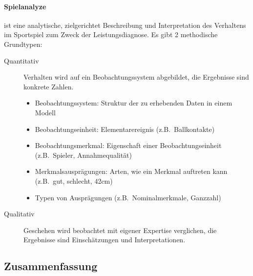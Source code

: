 \paragraph{Spielanalyze} ist eine analytische, zielgerichtet Beschreibung und Interpretation des Verhaltens im Sportspiel zum Zweck der Leistungsdiagnose.
Es gibt 2 methodische Grundtypen:
\begin{description}
  \item[Quantitativ] Verhalten wird auf ein Beobachtungssystem abgebildet, die Ergebnisse sind konkrete Zahlen.
    \begin{itemize}
      \item Beobachtungssystem: Struktur der zu erhebenden Daten in einem Modell
      \item Beobachtungseinheit: Elementarereignis (z.B.\ Ballkontakte)
      \item Beobachtungsmerkmal: Eigenschaft einer Beobachtungseinheit (z.B.\ Spieler, Annahmequalität)
      \item Merkmalsausprägungen: Arten, wie ein Merkmal auftreten kann (z.B.\ gut, schlecht, 42cm)
      \item Typen von Ausprägungen (z.B.\ Nominalmerkmale, Ganzzahl)
    \end{itemize}
  \item[Qualitativ] Geschehen wird beobachtet mit eigener Expertise verglichen, die Ergebnisse sind Einschätzungen und Interpretationen.
\end{description}

\subsection{Zusammenfassung}

